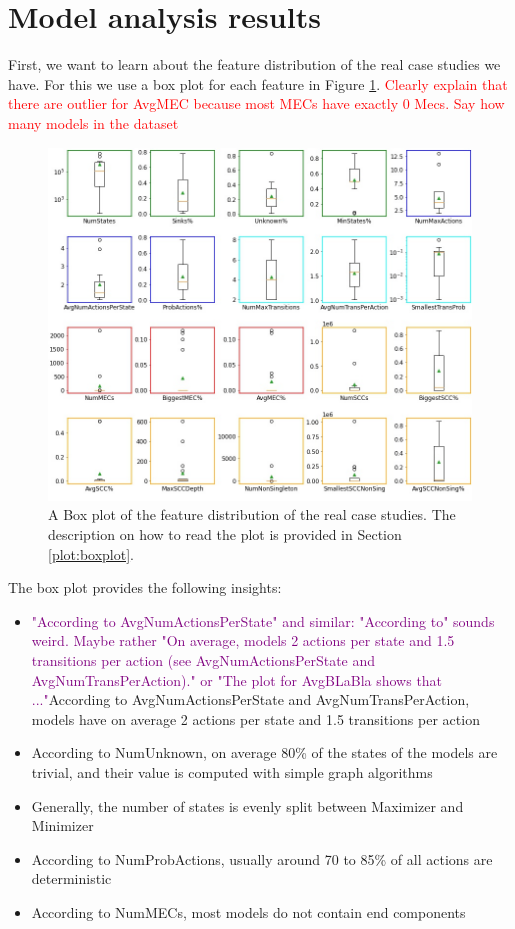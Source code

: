 \section{Model analysis results}
First, we want to learn about the feature distribution of the real case studies we have. 
For this we use a box plot for each feature in Figure \ref{fig:Real_FeatureDistribution}.
\textcolor{red}{Clearly explain that there are outlier for AvgMEC because most MECs have exactly 0 Mecs.}
\textcolor{red}{Say how many models in the dataset}
\begin{figure}[h!]
    \centering
    \includegraphics[width=1\textwidth]{figures/Real_FeatureDistribution.jpg}
    \caption[Feature Distribution of the case studies]{
        A Box plot of the feature distribution of the real case studies. The description on how to read the plot is provided in Section \ref{plot:boxplot}.
    }
    \label{fig:Real_FeatureDistribution}
\end{figure}
The box plot provides the following insights:
\begin{itemize} \label{insights:realDistribution}
    \item \textcolor{purple}{"According to AvgNumActionsPerState" and similar: "According to" sounds weird. Maybe rather "On average, models 2 actions per state and 1.5 transitions per action (see AvgNumActionsPerState and AvgNumTransPerAction)." or "The plot for AvgBLaBla shows that ..."}According to AvgNumActionsPerState and AvgNumTransPerAction, models have on average 2 actions per state and 1.5 transitions per action
    \item According to NumUnknown, on average 80\% of the states of the models are trivial, and their value is computed with simple graph algorithms 
    \item Generally, the number of states is evenly split between Maximizer and Minimizer
    \item According to NumProbActions, usually around 70 to 85\% of all actions are deterministic
    \item According to NumMECs, most models do not contain end components
\end{itemize}

